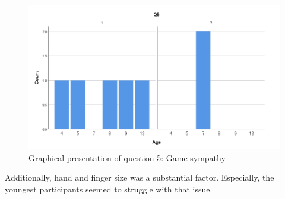 \begin{figure}[!ht]
    \centering
    \includegraphics[width=.6\textwidth]{figures/Q5.png}
    \caption{Graphical presentation of question 5: Game sympathy }
    \label{fig:Q5}
\end{figure}

Additionally, hand and finger size was a substantial factor. Especially, the youngest participants seemed to struggle with that issue. 


